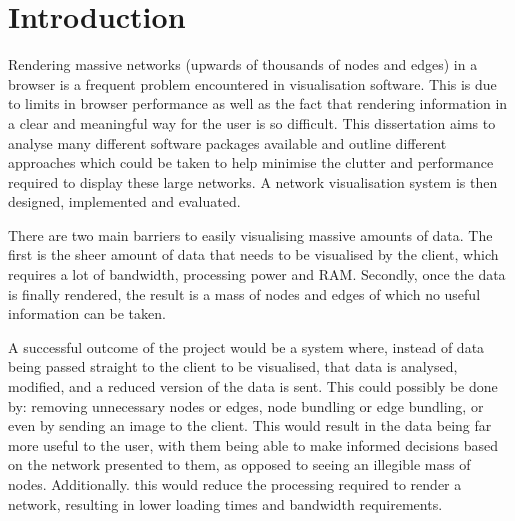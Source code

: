 \documentclass[../dissertation.tex]{subfiles}
\begin{document}
\chapter{Introduction}

Rendering massive networks (upwards of thousands of nodes and edges) in a browser is a frequent problem encountered in visualisation software. This is due to limits in browser performance as well as the fact that rendering information in a clear and meaningful way for the user is so difficult. This dissertation aims to analyse many different software packages available and outline different approaches which could be taken to help minimise the clutter and performance required to display these large networks. A network visualisation system is then designed, implemented and evaluated.

There are two main barriers to easily visualising massive amounts of data. The first is the sheer amount of data that needs to be visualised by the client, which requires a lot of bandwidth, processing power and RAM. Secondly, once the data is finally rendered, the result is a mass of nodes and edges of which no useful information can be taken. 

A successful outcome of the project would be a system where, instead of data being passed straight to the client to be visualised, that data is analysed, modified, and a reduced version of the data is sent. This could possibly be done by: removing unnecessary nodes or edges, node bundling or edge bundling, or even by sending an image to the client. This would result in the data being far more useful to the user, with them being able to make informed decisions based on the network presented to them, as opposed to seeing an illegible mass of nodes. Additionally. this would reduce the processing required to render a network, resulting in lower loading times and bandwidth requirements.
\end{document}
